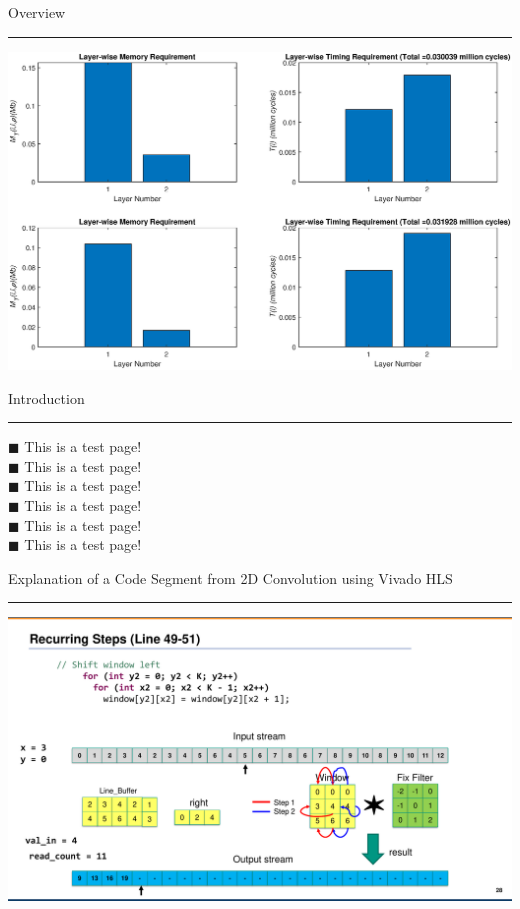 \documentclass{beamer}
\def\bsq{\color{blue(pigment)} $\blacksquare$ \color{black}}
\begin{document}
\begin{frame}{Overview\\\rule{10.5cm}{0.5pt}} \label{slide2}
\includegraphics[width=0.8\paperwidth]{overview.eps}
\end{frame}

\begin{frame}{Introduction\\\rule{10.5cm}{0.5pt}} \label{slide3}
\bsq This is a test page! \\
\bsq This is a test page! \\
\bsq This is a test page! \\
\bsq This is a test page! \\
\bsq This is a test page! \\
\bsq This is a test page!
\end{frame}

\begin{frame}{Explanation of a Code Segment from 2D Convolution using Vivado HLS\\\rule{10.5cm}{0.5pt}} \label{slide4}
\includegraphics[trim=10 15 50 80,clip,width=0.9\paperwidth]{pdf_file.pdf} %
\end{frame}
\end{document}
